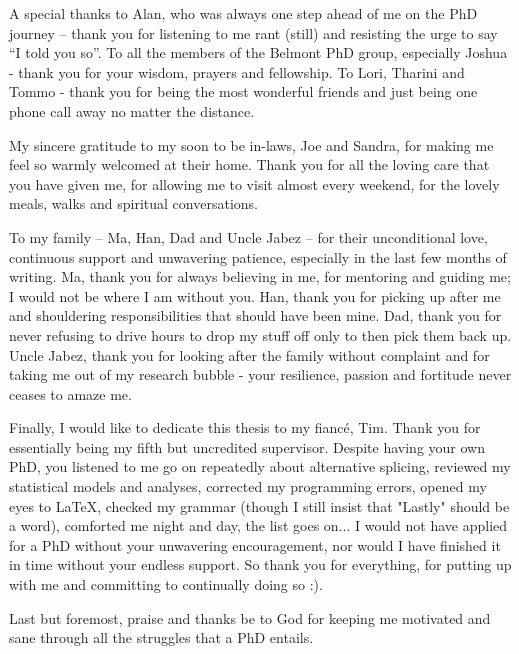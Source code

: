 A special thanks to Alan, who was always one step ahead of me on the PhD journey – thank you for listening to me rant (still) and resisting the urge to say “I told you so”. To all the members of the Belmont PhD group, especially Joshua - thank you for your wisdom, prayers and fellowship. To Lori, Tharini and Tommo - thank you for being the most wonderful friends and just being one phone call away no matter the distance. 

My sincere gratitude to my soon to be in-laws, Joe and Sandra, for making me feel so warmly welcomed at their home. Thank you for all the loving care that you have given me, for allowing me to visit almost every weekend, for the lovely meals, walks and spiritual conversations.
 
To my family – Ma, Han, Dad and Uncle Jabez – for their unconditional love, continuous support and unwavering patience, especially in the last few months of writing. Ma, thank you for always believing in me, for mentoring and guiding me; I would not be where I am without you. Han, thank you for picking up after me and shouldering responsibilities that should have been mine. Dad, thank you for never refusing to drive hours to drop my stuff off only to then pick them back up. Uncle Jabez, thank you for looking after the family without complaint and for taking me out of my research bubble - your resilience, passion and fortitude never ceases to amaze me.  

Finally, I would like to dedicate this thesis to my fiancé, Tim. Thank you for essentially being my fifth but uncredited supervisor. Despite having your own PhD, you listened to me go on repeatedly about alternative splicing, reviewed my statistical models and analyses, corrected my programming errors, opened my eyes to LaTeX, checked my grammar (though I still insist that "Lastly" should be a word), comforted me night and day, the list goes on... I would not have applied for a PhD without your unwavering encouragement, nor would I have finished it in time without your endless support. So thank you for everything, for putting up with me and committing to continually doing so :).

Last but foremost, praise and thanks be to God for keeping me motivated and sane through all the struggles that a PhD entails.

\endgroup